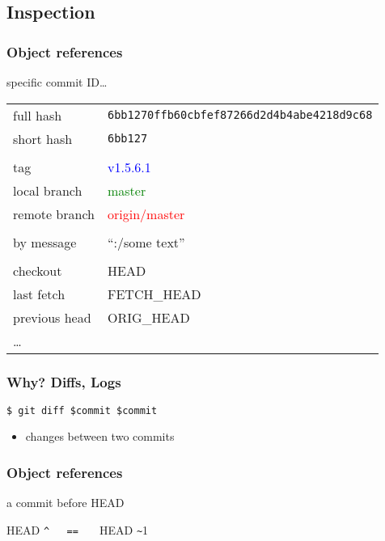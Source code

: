 \documentclass[english]{beamer}
\newcommand{\mysubsection}[2]{%
  \hypertarget{#2}{}%
  \subsection{#1}%
  \label{#2}%
}
\newcommand{\ttt}[1]{%
\texttt{\textcolor{code-black}{#1}}%
}
\newcommand{\CMD}[1]{%
\texttt{\textcolor{code-blue}{#1}}%
}
\newcommand{\faint}[1]{%
\textcolor{code-gray}{#1}%
}
\begin{document}
\mysubsection{Inspection}{using:inspection}
\begin{frame}
\frametitle{Object references}

specific commit ID\ldots
\vspace{\baselineskip}

{\small
\begin{tabular}{ll}
        full hash      & \ttt{6bb1270ffb60cbfef87266d2d4b4abe4218d9c68} \\
        short hash     & \ttt{6bb127} \\
        & \\
        tag            & \textcolor{blue}{v1.5.6.1} \\
        local branch   & \textcolor{green}{master} \\
        remote branch  & \textcolor{red}{origin/master} \\
        & \\
        by message     & ``:/some text'' \\
        & \\
        checkout       & HEAD \\
        last fetch     & FETCH\_HEAD \\
        previous head  & ORIG\_HEAD \\
        \ldots & \\
\end{tabular}
}

\vspace{.1\textheight}

\end{frame}

\begin{frame}
\frametitle{Why? Diffs, Logs}

\CMD{\$ git diff \$commit \$commit}
\begin{itemize}
        \item changes between two commits
\end{itemize}

\end{frame}

\begin{frame}[fragile]
\frametitle{Object references}

a commit before HEAD

\vspace{.1\textheight}
\begin{center}
        \faint{HEAD}\verb!^   ==   ! \faint{HEAD}\verb!~!1
\end{center}

\end{frame}
\end{document}
